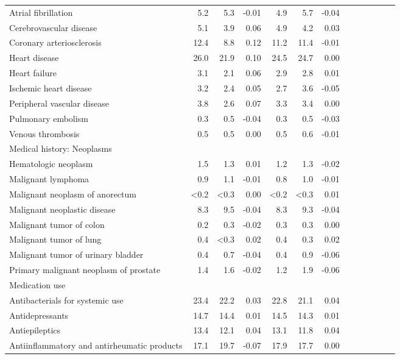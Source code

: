 \documentclass[11pt,]{article}
\begin{document}
\begin{longtable}{lrrrrrrrrrrrr}
      Atrial fibrillation &  5.2 &  5.3 & -0.01 &  4.9 &  5.7 & -0.04 \\ 
      Cerebrovascular disease &  5.1 &  3.9 &  0.06 &  4.9 &  4.2 &  0.03 \\ 
      Coronary arteriosclerosis & 12.4 &  8.8 &  0.12 & 11.2 & 11.4 & -0.01 \\ 
      Heart disease & 26.0 & 21.9 &  0.10 & 24.5 & 24.7 &  0.00 \\ 
      Heart failure &  3.1 &  2.1 &  0.06 &  2.9 &  2.8 &  0.01 \\ 
      Ischemic heart disease &  3.2 &  2.4 &  0.05 &  2.7 &  3.6 & -0.05 \\ 
      Peripheral vascular disease &  3.8 &  2.6 &  0.07 &  3.3 &  3.4 &  0.00 \\ 
      Pulmonary embolism &  0.3 &  0.5 & -0.04 &  0.3 &  0.5 & -0.03 \\ 
      Venous thrombosis &  0.5 &  0.5 &  0.00 &  0.5 &  0.6 & -0.01 \\ 
  Medical history: Neoplasms &    &    &     &    &    &     \\ 
      Hematologic neoplasm &  1.5 &  1.3 &  0.01 &  1.2 &  1.3 & -0.02 \\ 
      Malignant lymphoma &  0.9 &  1.1 & -0.01 &  0.8 &  1.0 & -0.01 \\ 
      Malignant neoplasm of anorectum & <0.2 & <0.3 &  0.00 & <0.2 & <0.3 &  0.01 \\ 
      Malignant neoplastic disease &  8.3 &  9.5 & -0.04 &  8.3 &  9.3 & -0.04 \\ 
      Malignant tumor of colon &  0.2 &  0.3 & -0.02 &  0.3 &  0.3 &  0.00 \\ 
      Malignant tumor of lung &  0.4 & <0.3 &  0.02 &  0.4 &  0.3 &  0.02 \\ 
      Malignant tumor of urinary bladder &  0.4 &  0.7 & -0.04 &  0.4 &  0.9 & -0.06 \\ 
      Primary malignant neoplasm of prostate &  1.4 &  1.6 & -0.02 &  1.2 &  1.9 & -0.06 \\ 
  Medication use &    &    &     &    &    &     \\ 
      Antibacterials for systemic use & 23.4 & 22.2 &  0.03 & 22.8 & 21.1 &  0.04 \\ 
      Antidepressants & 14.7 & 14.4 &  0.01 & 14.5 & 14.3 &  0.01 \\ 
      Antiepileptics & 13.4 & 12.1 &  0.04 & 13.1 & 11.8 &  0.04 \\ 
      Antiinflammatory and antirheumatic products & 17.1 & 19.7 & -0.07 & 17.9 & 17.7 &  0.00 \\ 

\end{longtable}
\end{document}

